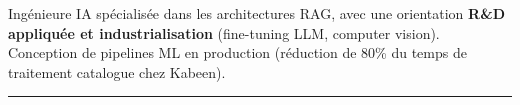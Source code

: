 {\fontsize{8.5}{11.5}\selectfont\color{bodytext}%
\justifying
Ing\'enieure IA sp\'ecialis\'ee dans les architectures RAG, avec une orientation \textbf{R\&D appliqu\'ee et industrialisation} (fine-tuning LLM, computer vision). Conception de pipelines ML en production (r\'eduction de 80\% du temps de traitement catalogue chez Kabeen).\par}

\vspace{4pt}
{\color{divider}\rule{\dimexpr{}\mainpad\relax}{0.4pt}}\par
\vspace{6pt}

